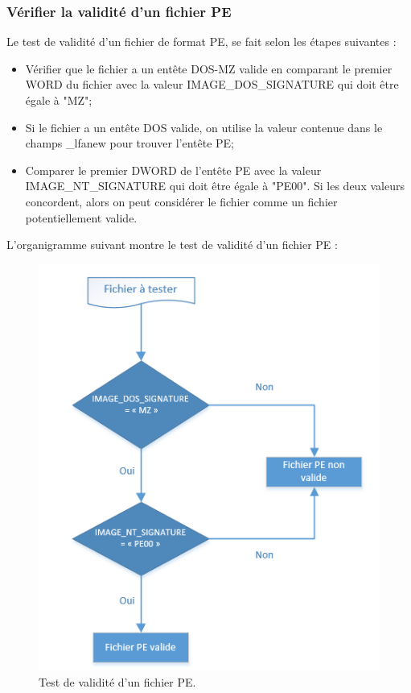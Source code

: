 \subsubsection{Vérifier  la validité d'un fichier PE}
Le test de validité d'un fichier de format PE, se fait selon les  étapes suivantes :
\begin{itemize}
\item Vérifier que le fichier a un entête DOS-MZ valide en comparant le premier WORD du fichier avec la valeur IMAGE\_DOS\_SIGNATURE qui doit être égale à "MZ";
\item Si le fichier a un entête DOS valide, on utilise la valeur contenue dans le champs \_lfanew pour trouver l'entête PE;
\item Comparer le premier DWORD de l'entête PE avec la valeur IMAGE\_NT\_SIGNATURE qui doit être égale à "PE00". Si les deux valeurs concordent, alors on peut considérer le fichier comme un fichier potentiellement valide.
\end{itemize}
L'organigramme suivant montre le test de validité d'un fichier PE :
\begin{figure}[H]
\begin{center}
\includegraphics[scale=0.6]{Figures/org.PNG}
\caption{Test de validité d'un fichier PE.}
\label{fig :org} 
\end{center}
\end{figure} 
